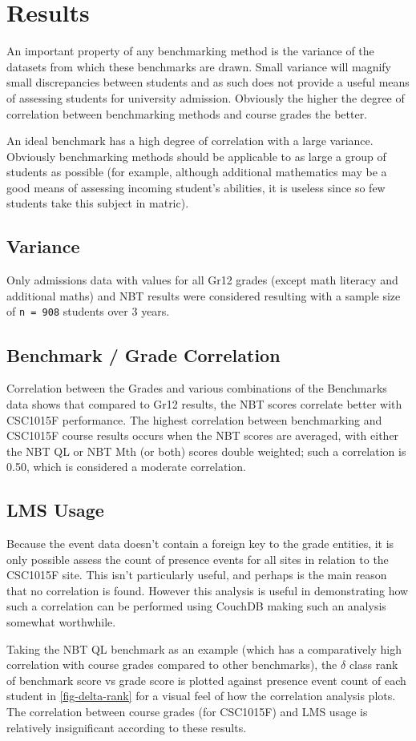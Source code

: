\section{Results}
An important property of any benchmarking method is the variance of the datasets from which these benchmarks are drawn. Small variance will magnify small discrepancies between students and as such does not provide a useful means of assessing students for university admission. Obviously the higher the degree of correlation between benchmarking methods and course grades the better.

An ideal benchmark has a high degree of correlation with a large variance. Obviously benchmarking methods should be applicable to as large a group of students as possible (for example, although additional mathematics may be a good means of assessing incoming student's abilities, it is useless since so few students take this subject in matric).

\subsection{Variance}
Only admissions data with values for all Gr12 grades (except math literacy and additional maths) and NBT results were considered resulting with a sample size of \texttt{n = 908} students over 3 years.

\subsection{Benchmark / Grade Correlation}
Correlation between the Grades and various combinations of the Benchmarks data shows that compared to Gr12 results, the NBT scores correlate better with CSC1015F performance. The highest correlation between benchmarking and CSC1015F course results occurs when the NBT scores are averaged, with either the NBT QL or NBT Mth (or both) scores double weighted; such a correlation is 0.50, which is considered a moderate correlation.

\subsection{LMS Usage}
Because the event data doesn't contain a foreign key to the grade entities, it is only possible assess the count of presence events for all sites in relation to the CSC1015F site. This isn't particularly useful, and perhaps is the main reason that no correlation is found. However this analysis is useful in demonstrating how such a correlation can be performed using CouchDB making such an analysis somewhat worthwhile.

Taking the NBT QL benchmark as an example (which has a comparatively high correlation with course grades compared to other benchmarks), the \( \delta \) class rank of benchmark score vs grade score is plotted against presence event count of each student in \ref{fig-delta-rank} for a visual feel of how the correlation analysis plots. The correlation between course grades (for CSC1015F) and LMS usage is relatively insignificant according to these results.

